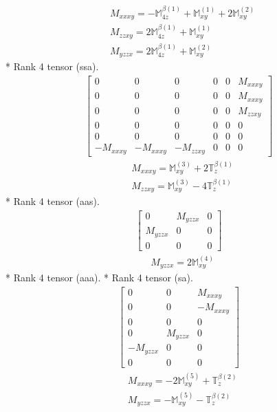 \documentclass[fleqn,8pt,landscape]{jsarticle}
\begin{document}
\begin{align*}
& M_{xxxy} = - \mathbb{M}_{4z}^{\beta(1)} + \mathbb{M}_{xy}^{(1)} + 2 \mathbb{M}_{xy}^{(2)} \\
& M_{zzxy} = 2 \mathbb{M}_{4z}^{\beta(1)} + \mathbb{M}_{xy}^{(1)} \\
& M_{yzzx} = 2 \mathbb{M}_{4z}^{\beta(1)} + \mathbb{M}_{xy}^{(2)}
\end{align*}
* Rank 4 tensor (ssa).
\begin{align*}
\begin{bmatrix} 0 & 0 & 0 & 0 & 0 & M_{xxxy} \\ 0 & 0 & 0 & 0 & 0 & M_{xxxy} \\ 0 & 0 & 0 & 0 & 0 & M_{zzxy} \\ 0 & 0 & 0 & 0 & 0 & 0 \\ 0 & 0 & 0 & 0 & 0 & 0 \\ - M_{xxxy} & - M_{xxxy} & - M_{zzxy} & 0 & 0 & 0 \end{bmatrix}
\end{align*}
\begin{align*}
& M_{xxxy} = \mathbb{M}_{xy}^{(3)} + 2 \mathbb{T}_{z}^{\beta(1)} \\
& M_{zzxy} = \mathbb{M}_{xy}^{(3)} - 4 \mathbb{T}_{z}^{\beta(1)}
\end{align*}
* Rank 4 tensor (aas).
\begin{align*}
\begin{bmatrix} 0 & M_{yzzx} & 0 \\ M_{yzzx} & 0 & 0 \\ 0 & 0 & 0 \end{bmatrix}
\end{align*}
\begin{align*}
& M_{yzzx} = 2 \mathbb{M}_{xy}^{(4)}
\end{align*}
* Rank 4 tensor (aaa).
* Rank 4 tensor (sa).
\begin{align*}
\begin{bmatrix} 0 & 0 & M_{xxxy} \\ 0 & 0 & - M_{xxxy} \\ 0 & 0 & 0 \\ 0 & M_{yzzx} & 0 \\ - M_{yzzx} & 0 & 0 \\ 0 & 0 & 0 \end{bmatrix}
\end{align*}
\begin{align*}
& M_{xxxy} = - 2 \mathbb{M}_{xy}^{(5)} + \mathbb{T}_{z}^{\beta(2)} \\
& M_{yzzx} = - \mathbb{M}_{xy}^{(5)} - \mathbb{T}_{z}^{\beta(2)}
\end{align*}
\end{document}
